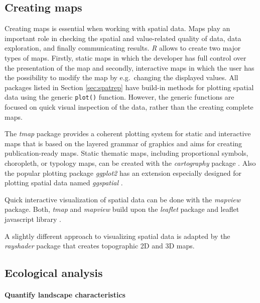 \documentclass[smallextended]{svjour3}       %
\begin{document}
\hypertarget{creating-maps}{%
\subsection{Creating maps}\label{creating-maps}}

Creating maps is essential when working with spatial data.
Maps play an important role in checking the spatial and value-related quality of data, data exploration, and finally communicating results.
\emph{R} allows to create two major types of maps.
Firstly, static maps in which the developer has full control over the presentation of the map and secondly, interactive maps in which the user has the possibility to modify the map by e.g.~changing the displayed values.
All packages listed in Section \ref{sec:spatrep} have build-in methods for plotting spatial data using the generic \texttt{plot()} function.
However, the generic functions are focused on quick visual inspection of the data, rather than the creating complete maps.

The \emph{tmap} package provides a coherent plotting system for static and interactive maps that is based on the layered grammar of graphics \cite{Tennekes2018} and aims for creating publication-ready maps.
Static thematic maps, including proportional symbols, choropleth, or typology maps, can be created with the \emph{cartography} package \cite{Giraud2016}.
Also the popular plotting package \emph{ggplot2} \cite{Wickham2016a} has an extension especially designed for plotting spatial data named \emph{ggspatial} \cite{R-ggspatial}.

Quick interactive visualization of spatial data can be done with the \emph{mapview} package\cite{R-mapview}.
Both, \emph{tmap} and \emph{mapview} build upon the \emph{leaflet} package and leaflet javascript library \cite{R-leaflet}.

A slightly different approach to visualizing spatial data is adapted by the \emph{rayshader} package \cite{Morgen-Wall2020} that creates topographic 2D and 3D maps.

\hypertarget{sec:ecological_analysis}{%
\subsection{Ecological analysis}\label{sec:ecological_analysis}}

\hypertarget{sec:landscape_metrics}{%
\paragraph{Quantify landscape characteristics}\label{sec:landscape_metrics}}
\end{document}
